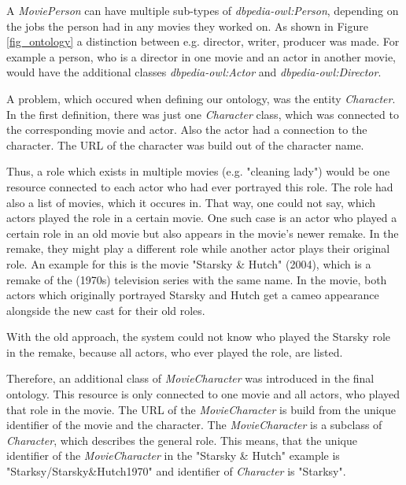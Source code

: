 A \textit{MoviePerson} can have multiple sub-types of \textit{dbpedia-owl:Person}, depending on the jobs the person had in any movies they worked on.
As shown in Figure \ref{fig_ontology} a distinction between e.g. director, writer, producer was made.
For example a person, who is a director in one movie and an actor in another movie, would have the additional classes \textit{dbpedia-owl:Actor} and \textit{dbpedia-owl:Director}.

A problem, which occured when defining our ontology, was the entity \textit{Character}.
In the first definition, there was just one \textit{Character} class, which was connected to the corresponding movie and actor.
Also the actor had a connection to the character.
The URL of the character was build out of the character name.

Thus, a role which exists in multiple movies (e.g. "cleaning lady") would be one resource connected to each actor who had ever portrayed this role.
The role had also a list of movies, which it occures in.
That way, one could not say, which actors played the role in a certain movie.
One such case is an actor who played a certain role in an old movie but also appears in the movie's newer remake.
In the remake, they might play a different role while another actor plays their original role.
An example for this is the movie "Starsky \& Hutch" (2004), which is a remake of the (1970s) television series with the same name.
In the movie, both actors which originally portrayed Starsky and Hutch get a cameo appearance alongside the new cast for their old roles.

With the old approach, the system could not know who played the Starsky role in the remake, because all actors, who ever played the role, are listed.

Therefore, an additional class of \textit{MovieCharacter} was introduced in the final ontology.
This resource is only connected to one movie and all actors, who played that role in the movie.
The URL of the \textit{MovieCharacter} is build from the unique identifier of the movie and the character.
The \textit{MovieCharacter} is a subclass of \textit{Character}, which describes the general role.
This means, that the unique identifier of the \textit{MovieCharacter} in the "Starsky \& Hutch" example is "Starksy/Starsky\&Hutch1970" and identifier of \textit{Character} is "Starksy".

